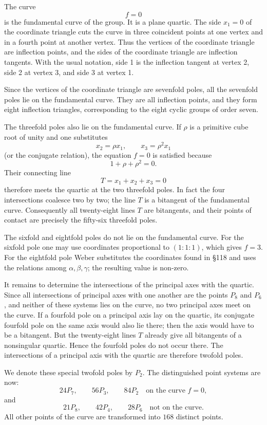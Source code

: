 \documentclass[12pt,a4paper]{article}
\begin{document}
The curve
\[
 f=0
\]
is the fundamental curve of the group.  It is a plane quartic.  The side \(x_1=0\) of the coordinate triangle cuts the curve in three coincident points at one vertex and in a fourth point at another vertex.  Thus the vertices of the coordinate triangle are inflection points, and the sides of the coordinate triangle are inflection tangents.  With the usual notation, side 1 is the inflection tangent at vertex 2, side 2 at vertex 3, and side 3 at vertex 1.

Since the vertices of the coordinate triangle are sevenfold poles, all the sevenfold poles lie on the fundamental curve.  They are all inflection points, and they form eight inflection triangles, corresponding to the eight cyclic groups of order seven.

The threefold poles also lie on the fundamental curve.  If \(\rho\) is a primitive cube root of unity and one substitutes
\[
 x_2=\rho x_1,
\qquad x_3=\rho^2x_1
\]
(or the conjugate relation), the equation \(f=0\) is satisfied because
\[
 1+\rho+\rho^2=0.
\]
Their connecting line
\[
 T=x_1+x_2+x_3=0
\]
therefore meets the quartic at the two threefold poles.  In fact the four intersections coalesce two by two; the line \(T\) is a bitangent of the fundamental curve.  Consequently all twenty-eight lines \(T\) are bitangents, and their points of contact are precisely the fifty-six threefold poles.

The sixfold and eightfold poles do not lie on the fundamental curve.  For the sixfold pole one may use coordinates proportional to \((1:1:1)\), which gives \(f=3\).  For the eightfold pole Weber substitutes the coordinates found in \S 118 and uses the relations among \(\alpha,\beta,\gamma\); the resulting value is non-zero.

It remains to determine the intersections of the principal axes with the quartic.  Since all intersections of principal axes with one another are the points \(P_8\) and \(P_6\), and neither of these systems lies on the curve, no two principal axes meet on the curve.  If a fourfold pole on a principal axis lay on the quartic, its conjugate fourfold pole on the same axis would also lie there; then the axis would have to be a bitangent.  But the twenty-eight lines \(T\) already give all bitangents of a nonsingular quartic.  Hence the fourfold poles do not occur there.  The intersections of a principal axis with the quartic are therefore twofold poles.

We denote these special twofold poles by \(P_2\).  The distinguished point systems are now:
\[
24P_7,
\qquad 56P_3,
\qquad 84P_2
\quad\text{on the curve }f=0,
\]
and
\[
21P_8,
\qquad 42P_4,
\qquad 28P_6
\quad\text{not on the curve.}
\]
All other points of the curve are transformed into \(168\) distinct points.
\end{document}
